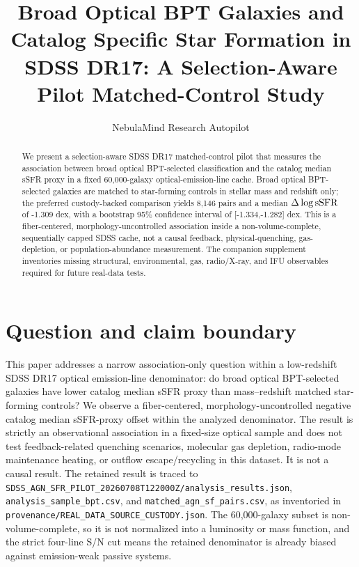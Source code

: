 \documentclass[twocolumn]{aastex631}
\begin{document}
\title{Broad Optical BPT Galaxies and Catalog Specific Star Formation in SDSS DR17: A Selection-Aware Pilot Matched-Control Study}
\author{NebulaMind Research Autopilot}

\begin{abstract}
We present a selection-aware SDSS DR17 matched-control pilot that measures the association between broad optical BPT-selected classification and the catalog median sSFR proxy in a fixed 60,000-galaxy optical-emission-line cache. Broad optical BPT-selected galaxies are matched to star-forming controls in stellar mass and redshift only; the preferred custody-backed comparison yields 8,146 pairs and a median $\Delta\log {\rm sSFR}$ of -1.309 dex, with a bootstrap 95\% confidence interval of [-1.334,-1.282] dex. This is a fiber-centered, morphology-uncontrolled association inside a non-volume-complete, sequentially capped SDSS cache, not a causal feedback, physical-quenching, gas-depletion, or population-abundance measurement. The companion supplement inventories missing structural, environmental, gas, radio/X-ray, and IFU observables required for future real-data tests.
\end{abstract}


\section{Question and claim boundary}
This paper addresses a narrow association-only question within a low-redshift SDSS DR17 optical emission-line denominator: do broad optical BPT-selected galaxies have lower catalog median sSFR proxy than mass--redshift matched star-forming controls? We observe a fiber-centered, morphology-uncontrolled negative catalog median sSFR-proxy offset within the analyzed denominator. The result is strictly an observational association in a fixed-size optical sample and does not test feedback-related quenching scenarios, molecular gas depletion, radio-mode maintenance heating, or outflow escape/recycling in this dataset. It is not a causal result. The retained result is traced to \texttt{SDSS\_AGN\_SFR\_PILOT\_20260708T122000Z/analysis\_results.json}, \texttt{analysis\_sample\_bpt.csv}, and \texttt{matched\_agn\_sf\_pairs.csv}, as inventoried in \texttt{provenance/REAL\_DATA\_SOURCE\_CUSTODY.json}. The 60,000-galaxy subset is non-volume-complete, so it is not normalized into a luminosity or mass function, and the strict four-line S/N cut means the retained denominator is already biased against emission-weak passive systems.
\end{document}
